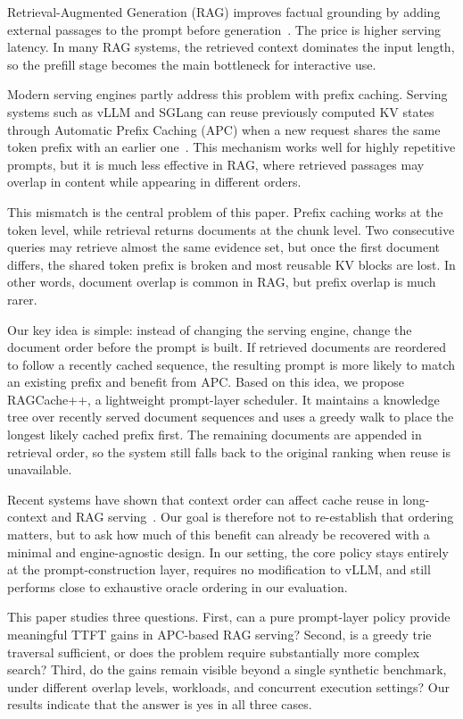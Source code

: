 \documentclass{article}
\begin{document}
Retrieval-Augmented Generation (RAG) improves factual grounding by adding external passages to the prompt before generation~\citep{lewis2020rag,gao2024ragsurvey}. The price is higher serving latency. In many RAG systems, the retrieved context dominates the input length, so the prefill stage becomes the main bottleneck for interactive use.

Modern serving engines partly address this problem with prefix caching. Serving systems such as vLLM and SGLang can reuse previously computed KV states through Automatic Prefix Caching (APC) when a new request shares the same token prefix with an earlier one~\citep{vllm_apc,zheng2024sglang}. This mechanism works well for highly repetitive prompts, but it is much less effective in RAG, where retrieved passages may overlap in content while appearing in different orders.

This mismatch is the central problem of this paper. Prefix caching works at the token level, while retrieval returns documents at the chunk level. Two consecutive queries may retrieve almost the same evidence set, but once the first document differs, the shared token prefix is broken and most reusable KV blocks are lost. In other words, document overlap is common in RAG, but prefix overlap is much rarer.

Our key idea is simple: instead of changing the serving engine, change the document order before the prompt is built. If retrieved documents are reordered to follow a recently cached sequence, the resulting prompt is more likely to match an existing prefix and benefit from APC. Based on this idea, we propose RAGCache++, a lightweight prompt-layer scheduler. It maintains a knowledge tree over recently served document sequences and uses a greedy walk to place the longest likely cached prefix first. The remaining documents are appended in retrieval order, so the system still falls back to the original ranking when reuse is unavailable.

Recent systems have shown that context order can affect cache reuse in long-context and RAG serving~\citep{jin2025ragcache,cachecraft2025,contextpilot2025}. Our goal is therefore not to re-establish that ordering matters, but to ask how much of this benefit can already be recovered with a minimal and engine-agnostic design. In our setting, the core policy stays entirely at the prompt-construction layer, requires no modification to vLLM, and still performs close to exhaustive oracle ordering in our evaluation.

This paper studies three questions. First, can a pure prompt-layer policy provide meaningful TTFT gains in APC-based RAG serving? Second, is a greedy trie traversal sufficient, or does the problem require substantially more complex search? Third, do the gains remain visible beyond a single synthetic benchmark, under different overlap levels, workloads, and concurrent execution settings? Our results indicate that the answer is yes in all three cases.
\end{document}
